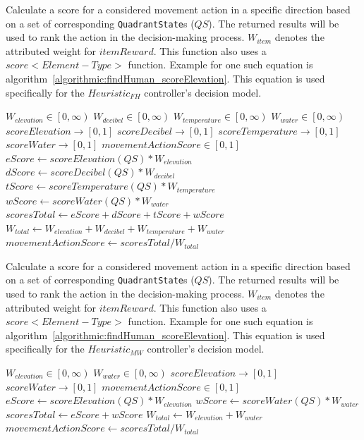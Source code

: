 \begin{algorithm}[H]
  \caption{Calculate a score for a considered movement action in a specific direction based on a set of corresponding \texttt{QuadrantState}s ($QS$). The returned results will be used to rank the action in the decision-making process. $W_{item}$ denotes the attributed weight for $itemReward$. This function also uses a $score<Element-Type>$ function. Example for one such equation is algorithm~\ref{algorithmic:findHuman_scoreElevation}. This equation is used specifically for the $Heuristic_{FH}$ controller's decision model.}
  \begin{algorithmic} \label{algorithmic:findHuman_scoreMovmentAction}
    \REQUIRE $W_{elevation} \in \left[0, \infty \right)$
    \REQUIRE $W_{decibel} \in \left[0, \infty \right)$
    \REQUIRE $W_{temperature} \in \left[0, \infty \right)$
    \REQUIRE $W_{water} \in \left[0, \infty \right)$
    \ENSURE $scoreElevation \rightarrow \left[0, 1 \right]$
    \ENSURE $scoreDecibel \rightarrow \left[0, 1 \right]$
    \ENSURE $scoreTemperature \rightarrow \left[0, 1 \right]$
    \ENSURE $scoreWater \rightarrow \left[0, 1 \right]$
    \ENSURE $movementActionScore \in \left[0, 1 \right]$
    \STATE $eScore \leftarrow scoreElevation(QS) * W_{elevation}$
    \STATE $dScore \leftarrow scoreDecibel(QS) * W_{decibel}$
    \STATE $tScore \leftarrow scoreTemperature(QS) * W_{temperature}$
    \STATE $wScore \leftarrow scoreWater(QS) * W_{water}$
    \STATE $scoresTotal \leftarrow eScore + dScore + tScore + wScore$
    \STATE $W_{total} \leftarrow W_{elevation} + W_{decibel} + W_{temperature} + W_{water}$
    \RETURN $movementActionScore \leftarrow scoresTotal / W_{total}$
  \end{algorithmic}
\end{algorithm}


\begin{algorithm}[H]
  \caption{Calculate a score for a considered movement action in a specific direction based on a set of corresponding \texttt{QuadrantState}s ($QS$). The returned results will be used to rank the action in the decision-making process. $W_{item}$ denotes the attributed weight for $itemReward$. This function also uses a $score<Element-Type>$ function. Example for one such equation is algorithm~\ref{algorithmic:findHuman_scoreElevation}. This equation is used specifically for the $Heuristic_{MW}$ controller's decision model.}
  \begin{algorithmic} \label{algorithmic:mapWater_scoreMovementAction}
    \REQUIRE $W_{elevation} \in \left[0, \infty \right)$
    \REQUIRE $W_{water} \in \left[0, \infty \right)$
    \ENSURE $scoreElevation \rightarrow \left[0, 1 \right]$
    \ENSURE $scoreWater \rightarrow \left[0, 1 \right]$
    \ENSURE $movementActionScore \in \left[0, 1 \right]$
    \STATE $eScore \leftarrow scoreElevation(QS) * W_{elevation}$
    \STATE $wScore \leftarrow scoreWater(QS) * W_{water}$
    \STATE $scoresTotal \leftarrow eScore + wScore$
    \STATE $W_{total} \leftarrow W_{elevation} + W_{water}$
    \RETURN $movementActionScore \leftarrow scoresTotal / W_{total}$
  \end{algorithmic}
\end{algorithm}


